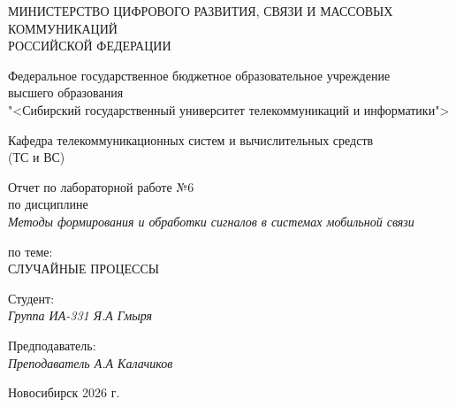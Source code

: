 \thispagestyle{empty}

\begin{center}
    МИНИСТЕРСТВО ЦИФРОВОГО РАЗВИТИЯ, СВЯЗИ И МАССОВЫХ КОММУНИКАЦИЙ \\ РОССИЙСКОЙ ФЕДЕРАЦИИ

    \vspace{20pt}

    Федеральное государственное бюджетное образовательное учреждение  \\  высшего образования \\
    "<Сибирский государственный университет телекоммуникаций и информатики"> \\

    \vspace{20pt}

    Кафедра телекоммуникационных систем и вычислительных средств \\  (ТС и ВС)
\end{center}

\vfill

\begin{center}
    Отчет по лабораторной работе №6 \\  
    по дисциплине \\
    \textit{Методы формирования и обработки сигналов в системах мобильной связи}

    \vspace{20pt}

    по теме: \\
    \uppercase{Случайные процессы}
\end{center}

\vfill

    \noindent Студент: \\
    \textit{Группа ИА-331 \hfill Я.А Гмыря}

    \vspace{20pt}

    \noindent Предподаватель: \\
    \textit{Преподаватель \hfill А.А Калачиков}

\vfill

\begin{center}
    Новосибирск 2026 г.
\end{center}